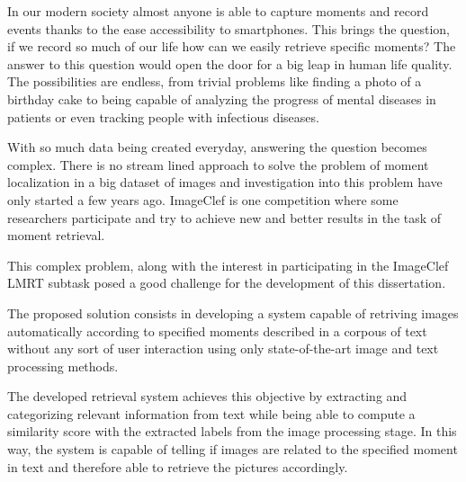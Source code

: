     {In our modern society almost anyone is able to capture moments and record events thanks to the ease accessibility to smartphones. This brings the question, if we record so much of our life how can we easily retrieve specific moments? The answer to this question would open the door for a big leap in human life quality. The possibilities are endless, from trivial problems like finding a photo of a birthday cake to being capable of analyzing the progress of mental diseases in patients or even tracking people with infectious diseases.}

     \TEXT{}
     {With so much data being created everyday, answering the question becomes complex. There is no stream lined approach to solve the problem of moment localization in a big dataset of images and investigation into this problem have only started a few years ago. ImageClef is one competition where some researchers participate and try to achieve new and better results in the task of moment retrieval.}

     \TEXT{}
     {This complex problem, along with the interest in participating in the ImageClef LMRT subtask posed a good challenge for the development of this dissertation.}

     \TEXT{}
     {The proposed solution consists in developing a system capable of retriving images automatically  according to specified moments described in a corpous of text without any sort of user interaction using only state-of-the-art image and text processing methods.}

     \TEXT{}
     {The developed retrieval system achieves this objective by extracting and categorizing relevant information from text while being able to compute a similarity score with the extracted labels from the image processing stage. In this way, the system is capable of telling if images are related to the specified moment in text and therefore able to retrieve the pictures accordingly.}

\EndTitlePage
\titlepage\ \endtitlepage %
